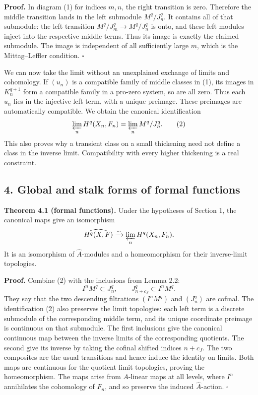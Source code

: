 \documentclass[11pt]{article}
\begin{document}
\textbf{Proof.} In diagram (1) for indices \(m,n\), the right transition
is zero. Therefore the middle transition lands in the left submodule
\(M^q/J_n^q\). It contains all of that submodule: the left transition
\(M^q/J_m^q\to M^q/J_n^q\) is onto, and these left modules inject into
the respective middle terms. Thus its image is exactly the claimed
submodule. The image is independent of all sufficiently large \(m\),
which is the Mittag--Leffler condition. \(\square\)

We can now take the limit without an unexplained exchange of limits and
cohomology. If \((u_n)\) is a compatible family of middle classes in
(1), its images in \(K_n^{q+1}\) form a compatible family in a pro-zero
system, so are all zero. Thus each \(u_n\) lies in the injective left
term, with a unique preimage. These preimages are automatically
compatible. We obtain the canonical identification \[
\varprojlim_n H^q(X_n,F_n)=\varprojlim_n M^q/J_n^q.
\tag{2}
\] This also proves why a transient class on a small thickening need not
define a class in the inverse limit. Compatibility with every higher
thickening is a real constraint.

\subsection{4. Global and stalk forms of formal
functions}\label{global-and-stalk-forms-of-formal-functions}

\textbf{Theorem 4.1 (formal functions).} Under the hypotheses of Section
1, the canonical maps give an isomorphism \[
\widehat{H^q(X,F)}\xrightarrow{\sim}\varprojlim_n H^q(X_n,F_n).
\] It is an isomorphism of \(\widehat A\)-modules and a homeomorphism
for their inverse-limit topologies.

\textbf{Proof.} Combine (2) with the inclusions from Lemma 2.2: \[
I^nM^q\subset J_n^q,\qquad J_{n+c_J}^q\subset I^nM^q.
\] They say that the two descending filtrations \((I^nM^q)\) and
\((J_n^q)\) are cofinal. The identification (2) also preserves the limit
topologies: each left term is a discrete submodule of the corresponding
middle term, and its unique coordinate preimage is continuous on that
submodule. The first inclusions give the canonical continuous map
between the inverse limits of the corresponding quotients. The second
give its inverse by taking the cofinal shifted indices \(n+c_J\). The
two composites are the usual transitions and hence induce the identity
on limits. Both maps are continuous for the quotient limit topologies,
proving the homeomorphism. The maps arise from \(A\)-linear maps at all
levels, where \(I^n\) annihilates the cohomology of \(F_n\), and so
preserve the induced \(\widehat A\)-action. \(\square\)
\end{document}
